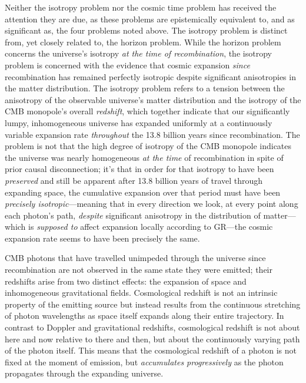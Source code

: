 \documentclass[aps,prd,reprint,superscriptaddress]{revtex4-2}
\begin{document}
Neither the isotropy problem nor the cosmic time problem has received the attention they are due, as these problems are epistemically equivalent to, and as significant as, the four problems noted above. The isotropy problem is distinct from, yet closely related to, the horizon problem. While the horizon problem concerns the universe's isotropy \textit{at the time of recombination}, the isotropy problem is concerned with the evidence that cosmic expansion \textit{since} recombination has remained perfectly isotropic despite significant anisotropies in the matter distribution. The isotropy problem refers to a tension between the anisotropy of the observable universe's matter distribution and the isotropy of the CMB monopole's overall \textit{redshift}, which together indicate that our significantly lumpy, inhomogeneous universe has expanded uniformly at a continuously variable expansion rate \textit{throughout} the 13.8 billion years since recombination. The problem is not that the high degree of isotropy of the CMB monopole indicates the universe was nearly homogeneous \textit{at the time} of recombination in spite of prior causal disconnection; it's that in order for that isotropy to have been \textit{preserved} and still be apparent after 13.8 billion years of travel through expanding space, the cumulative expansion over that period must have been \textit{precisely isotropic}---meaning that in every direction we look, at every point along each photon's path, \textit{despite} significant anisotropy in the distribution of matter---which is \textit{supposed to} affect expansion locally according to GR---the cosmic expansion rate seems to have been precisely the same.

CMB photons that have travelled unimpeded through the universe since recombination are not observed in the same state they were emitted; their redshifts arise from two distinct effects: the expansion of space and inhomogeneous gravitational fields. Cosmological redshift is not an intrinsic property of the emitting source but instead results from the continuous stretching of photon wavelengths as space itself expands along their entire trajectory. In contrast to Doppler and gravitational redshifts, cosmological redshift is not about here and now relative to there and then, but about the continuously varying path of the photon itself. This means that the cosmological redshift of a photon is not fixed at the moment of emission, but \textit{accumulates progressively} as the photon propagates through the expanding universe. 
\end{document}
